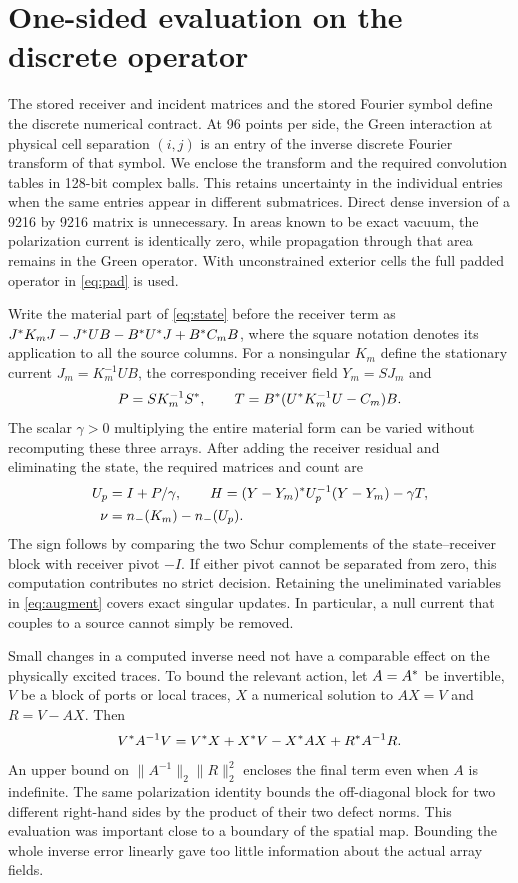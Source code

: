 \appendix
\section{One-sided evaluation on the discrete operator}\label{sec:implementation}
The stored receiver and incident matrices and the stored Fourier symbol define the discrete numerical contract. At 96 points per side, the Green interaction at physical cell separation $(i,j)$ is an entry of the inverse discrete Fourier transform of that symbol. We enclose the transform and the required convolution tables in 128-bit complex balls. This retains uncertainty in the individual entries when the same entries appear in different submatrices. Direct dense inversion of a 9216 by 9216 matrix is unnecessary. In areas known to be exact vacuum, the polarization current is identically zero, while propagation through that area remains in the Green operator. With unconstrained exterior cells the full padded operator in \eqref{eq:pad} is used.

Write the material part of \eqref{eq:state} before the receiver term as $J^{\ast} K_mJ-J^{\ast} U B-B^{\ast} U^{\ast} J+B^{\ast} C_mB$, where the square notation denotes its application to all the source columns. For a nonsingular $K_m$ define the stationary current $J_m=K_m^{-1}UB$, the corresponding receiver field $Y_m=SJ_m$ and
\[
 P=SK_m^{-1}S^{\ast},\qquad
 T=B^{\ast}(U^{\ast} K_m^{-1}U-C_m)B.
\]
The scalar $\gamma>0$ multiplying the entire material form can be varied without recomputing these three arrays. After adding the receiver residual and eliminating the state, the required matrices and count are
\begin{align}
 U_p&=I+P/\gamma,\qquad
 H=(Y-Y_m)^{\ast} U_p^{-1}(Y-Y_m)-\gamma T,\\
 \nu&=n_{-}(K_m)-n_{-}(U_p).                             \label{eq:receiver}
\end{align}
The sign follows by comparing the two Schur complements of the state--receiver block with receiver pivot $-I$. If either pivot cannot be separated from zero, this computation contributes no strict decision. Retaining the uneliminated variables in \eqref{eq:augment} covers exact singular updates. In particular, a null current that couples to a source cannot simply be removed.

Small changes in a computed inverse need not have a comparable effect on the physically excited traces. To bound the relevant action, let $A=A^{\ast}$ be invertible, $V$ be a block of ports or local traces, $X$ a numerical solution to $AX=V$ and $R=V-AX$. Then
\begin{equation}
 V^{\ast} A^{-1}V=V^{\ast} X+X^{\ast} V-X^{\ast} AX+R^{\ast} A^{-1}R.           \label{eq:second}
\end{equation}
An upper bound on $\|A^{-1}\|_2\|R\|_2^2$ encloses the final term even when $A$ is indefinite. The same polarization identity bounds the off-diagonal block for two different right-hand sides by the product of their two defect norms. This evaluation was important close to a boundary of the spatial map. Bounding the whole inverse error linearly gave too little information about the actual array fields.

